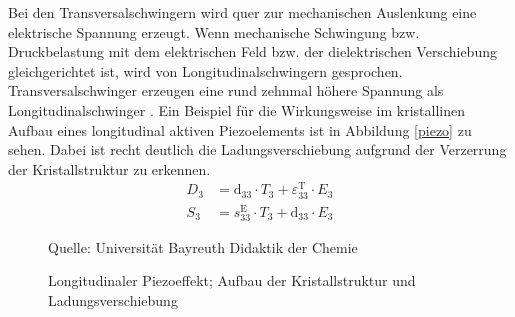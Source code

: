 \documentclass[12pt]{scrreprt} %
\begin{document}
Bei den Transversalschwingern wird quer zur mechanischen Auslenkung eine elektrische Spannung erzeugt. Wenn mechanische Schwingung bzw. Druckbelastung mit dem elektrischen Feld bzw. der dielektrischen Verschiebung gleichgerichtet ist, wird von Longitudinalschwingern gesprochen. Transversalschwinger erzeugen eine rund zehnmal höhere Spannung als Longitudinalschwinger \citep[S.39]{Dembowski2011}. Ein Beispiel für die Wirkungsweise im kristallinen Aufbau eines longitudinal aktiven Piezoelements ist in Abbildung \vref{piezo} zu sehen. Dabei ist recht deutlich die Ladungsverschiebung aufgrund der Verzerrung der Kristallstruktur zu erkennen. 
\begin{align}
D_3 & =  \textrm{d}_{33} \cdot T_3 + \varepsilon_{33}^{\textrm{T}} \cdot E_3 \label{formel:3.5} \\
S_3 & =  s_{33}^{\textrm{E}} \cdot T_3 + \textrm{d}_{33} \cdot E_3 \label{formel:3.6}
\end{align}
\begin {figure}[htbp]
\caption[Longitudinaler Piezoeffekt; Kristallstruktur und Ladungsverschiebung]{Longitudinaler Piezoeffekt; Aufbau der Kristallstruktur und Ladungsverschiebung}
      \begin{center}
      \end{center}
Quelle: Universität Bayreuth Didaktik der Chemie \citep{BAY}
\label{piezo}
\end{figure}
\end{document}
